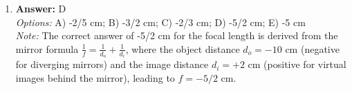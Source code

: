 \documentclass[12pt]{article}
\begin{document}
\begin{enumerate}[label=\arabic*.]
\\ \textit{Options:} A) remains the same; B) none of these; C) hotter; D) the temperature oscillates; E) it gets colder, but only under low pressure
\\ \textit{Note:} An ideal gas remains at the same temperature during expansion under the condition $pV^2$ = Const because this relationship indicates an isothermal process where the internal energy and thus the temperature of the gas does not change.
\item \textbf{Answer:} D
\\ \textit{Options:} A) -2/5 cm; B) -3/2 cm; C) -2/3 cm; D) -5/2 cm; E) -5 cm
\\ \textit{Note:} The correct answer of -5/2 cm for the focal length is derived from the mirror formula \( \frac{1}{f} = \frac{1}{d_o} + \frac{1}{d_i} \), where the object distance \( d_o = -10 \) cm (negative for diverging mirrors) and the image distance \( d_i = +2 \) cm (positive for virtual images behind the mirror), leading to \( f = -5/2 \) cm.
\end{enumerate}
\end{document}
